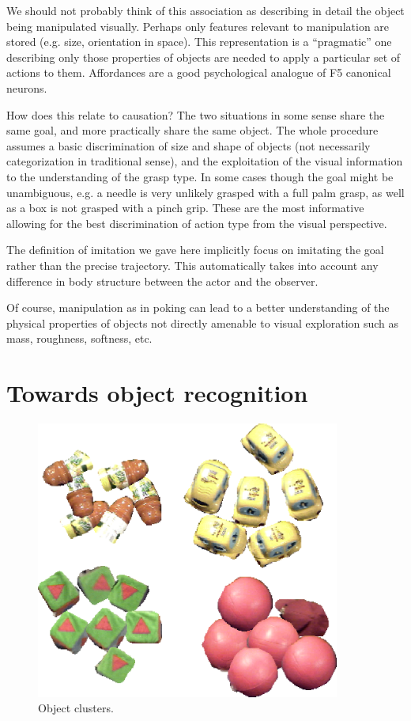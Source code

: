 We should not probably think of this association as describing in
detail the object being manipulated visually. Perhaps only features
relevant to manipulation are stored (e.g. size, orientation in space).
This representation is a ``pragmatic'' one describing only those
properties of objects are needed to apply a particular set of actions
to them. Affordances are a good psychological analogue of F5
canonical neurons.
\fi


\ifverbose
How does this relate to causation?  The two situations in some sense
share the same goal, and more practically share the same object.  The
whole procedure assumes a basic discrimination of size and shape of
objects (not necessarily categorization in traditional sense), and the
exploitation of the visual information to the understanding of the
grasp type. In some cases though the goal might be unambiguous, e.g. a
needle is very unlikely grasped with a full palm grasp, as well as a
box is not grasped with a pinch grip. These are the most informative
allowing for the best discrimination of action type from the visual
perspective.
\fi

\ifverbose
The definition of imitation we gave here implicitly focus on imitating
the goal rather than the precise trajectory. This automatically takes
into account any difference in body structure between the actor and
the observer.

Of course, manipulation as in poking can lead to a better
understanding of the physical properties of objects not directly
amenable to visual exploration such as mass, roughness, softness, etc.
\fi


\section{Towards object recognition}

\begin{figure}[tbh]
\begin{center}
\includegraphics[width=10cm]{fig-object-clusters2.eps}
\caption{ 
\label{fig:objects-clusters}
%
Object clusters.
%
}
\end{center}
\end{figure}


